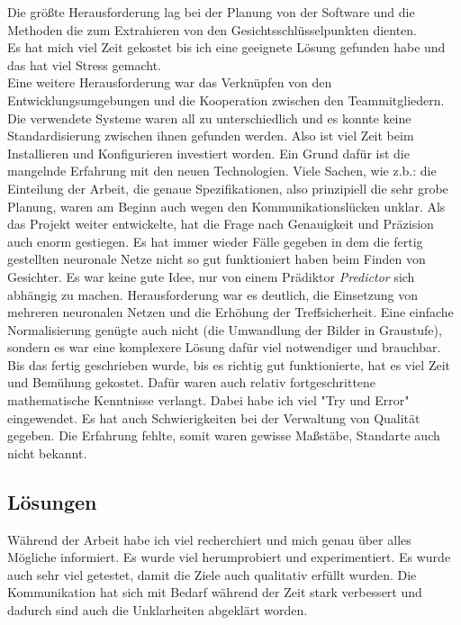Die größte Herausforderung lag bei der Planung von der Software und die Methoden die zum Extrahieren von den Gesichtsschlüsselpunkten dienten.\\
Es hat mich viel Zeit gekostet bis ich eine geeignete Lösung gefunden habe und das hat viel Stress gemacht. \\
Eine weitere Herausforderung war das Verknüpfen von den Entwicklungsumgebungen und die Kooperation zwischen den Teammitgliedern. \\
Die verwendete Systeme waren all zu unterschiedlich und es konnte keine Standardisierung zwischen ihnen gefunden werden. Also ist viel Zeit beim Installieren und Konfigurieren investiert worden. Ein Grund dafür ist die mangelnde Erfahrung mit den neuen Technologien. 
\justify
Viele Sachen, wie z.b.: die Einteilung der Arbeit, die genaue Spezifikationen, also prinzipiell die sehr grobe Planung, waren am Beginn auch wegen den Kommunikationslücken unklar. 
\justify
Als das Projekt weiter entwickelte, hat die Frage nach Genauigkeit und Präzision auch enorm gestiegen.
Es hat immer wieder Fälle gegeben in dem die fertig gestellten neuronale Netze nicht so gut funktioniert haben beim Finden von Gesichter. 
\justify
Es war keine gute Idee, nur von einem Prädiktor \textit{Predictor} sich abhängig zu machen. 
Herausforderung war es deutlich, die Einsetzung von mehreren neuronalen Netzen und die Erhöhung der Treffsicherheit.
\justify
Eine einfache Normalisierung genügte auch nicht (die Umwandlung der Bilder in Graustufe), sondern es war eine komplexere Lösung dafür viel notwendiger und brauchbar. \\
Bis das fertig geschrieben wurde, bis es richtig gut funktionierte, hat es viel Zeit und Bemühung gekostet. 
Dafür waren auch relativ fortgeschrittene mathematische Kenntnisse verlangt. Dabei habe ich viel "Try und Error" eingewendet. 
\justify 
Es hat auch Schwierigkeiten bei der Verwaltung von Qualität gegeben. Die Erfahrung fehlte, somit waren gewisse Maßstäbe, Standarte auch nicht bekannt. 



\subsection{Lösungen}
Während der Arbeit habe ich viel recherchiert und mich genau über alles Mögliche informiert. 
\justify 
Es wurde viel herumprobiert und experimentiert. Es wurde auch sehr viel getestet, damit die Ziele auch qualitativ erfüllt wurden. 
\justify
Die Kommunikation hat sich mit Bedarf während der Zeit stark verbessert und dadurch sind auch die Unklarheiten abgeklärt worden. \\


